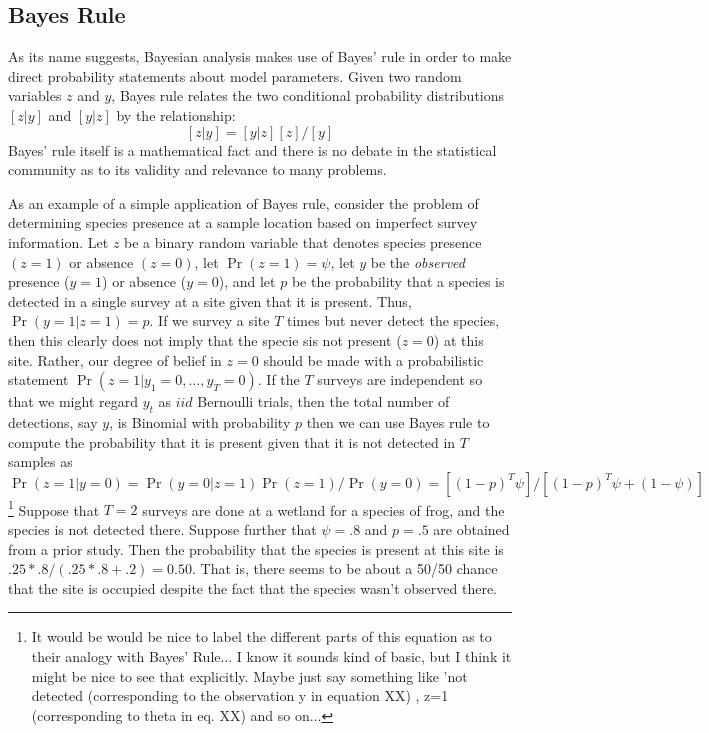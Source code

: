 \subsection{Bayes Rule}

As its name suggests, Bayesian analysis makes use of Bayes' rule in
order to make direct probability statements about model
parameters. Given two random variables $z$ and $y$, Bayes rule relates
the two conditional probability distributions $[z|y]$ and $[y|z]$ by the relationship:
\[
[z|y] = [y|z][z]/[y]
\]
Bayes' rule itself is a mathematical fact and there is no debate in
the statistical community as to its validity and relevance to many
problems. 

As an example of a simple application of Bayes rule,
consider the problem of determining species presence at a sample
location based on imperfect survey information. Let $z$ be a binary
random variable that denotes species presence $(z=1)$ or absence
$(z=0)$, let $\Pr(z=1) = \psi$, let $y$ be the {\it observed} presence
($y=1$) or absence ($y=0$), and let $p$ be the probability that a
species is detected in a single survey at a site given that it is
present. Thus, $\Pr(y=1|z=1)=p$.
If we survey a site $T$ times but never detect the species,
then this clearly does not imply that the specie sis not present
($z=0$) at this site. Rather, our degree of belief in $z=0$ should be
made with a probabilistic statement
$\Pr(z=1|y_1=0,\ldots,y_{T}=0)$. If the $T$ surveys are independent so
that we might regard $y_{t}$ as $iid$ Bernoulli trials, then the total
number of detections, say $y$, is Binomial with probability $p$ then
we can use Bayes rule to compute the probability that it is present
given that it is not detected in $T$ samples as
\[
\Pr(z=1|y=0) = \Pr(y=0|z=1)\Pr(z=1)/\Pr(y=0) = 
[(1-p)^{T} \psi]/[ (1-p)^T \psi + (1-\psi) ]
\]
\footnote{
It would be would be nice to label the different parts of this
  equation as to their analogy with Bayes' Rule... I know it sounds
  kind of basic, but I think it might be nice to see that
  explicitly. Maybe just say something like 'not detected
  (corresponding to the observation y in equation XX) , z=1
  (corresponding to theta in eq. XX) and so on... 
}
Suppose that $T=2$ surveys are done at a wetland for a species of
frog, and the species is not detected there. Suppose further that $\psi
= .8$ and $p = .5$ are obtained from a prior study.  Then the
probability that the species is present at this site is
$.25*.8/(.25*.8 + .2) = 0.50$. That is, there seems to be about a
50/50 chance that the site is occupied despite the fact that the
species wasn't observed there.

